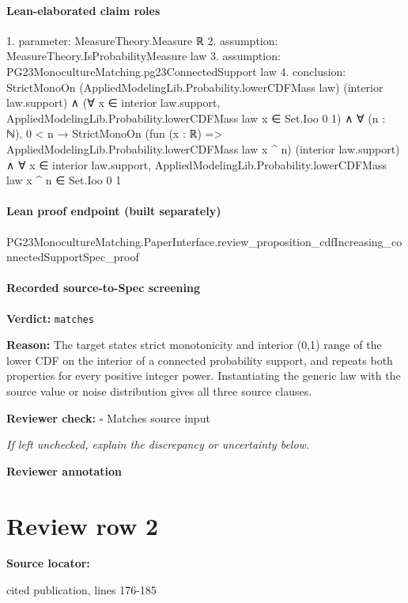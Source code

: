 \documentclass[10pt]{article}
\newcommand{\reviewerbox}{%
  \par\noindent\fbox{\parbox{0.96\linewidth}{\rule{0pt}{0.38in}}}\par
}
\newcommand{\reviewmatch}[1]{%
  \par\noindent\textbf{Reviewer check:} $\square$\; #1\par
  \noindent\emph{If left unchecked, explain the discrepancy or uncertainty below.}\par
}
\begin{document}
\paragraph{Lean-elaborated claim roles}\begin{ReviewVerbatim}
1. parameter: MeasureTheory.Measure ℝ
2. assumption: MeasureTheory.IsProbabilityMeasure law
3. assumption: PG23MonocultureMatching.pg23ConnectedSupport law
4. conclusion: StrictMonoOn (AppliedModelingLib.Probability.lowerCDFMass law) (interior law.support) ∧
  (∀ x ∈ interior law.support, AppliedModelingLib.Probability.lowerCDFMass law x ∈ Set.Ioo 0 1) ∧
    ∀ (n : ℕ),
      0 < n →
        StrictMonoOn (fun (x : ℝ) => AppliedModelingLib.Probability.lowerCDFMass law x ^ n) (interior law.support) ∧
          ∀ x ∈ interior law.support, AppliedModelingLib.Probability.lowerCDFMass law x ^ n ∈ Set.Ioo 0 1
\end{ReviewVerbatim}

\paragraph{Lean proof endpoint (built separately)}\begin{ReviewVerbatim}
PG23MonocultureMatching.PaperInterface.review_proposition_cdfIncreasing_connectedSupportSpec_proof
\end{ReviewVerbatim}

\paragraph{Recorded source-to-Spec screening}
\textbf{Verdict:} \texttt{matches}
\\
{\raggedright
\textbf{Reason:} The target states strict monotonicity and interior (0,1) range of the lower CDF on the interior of a connected probability support, and repeats both properties for every positive integer power.\allowbreak{} Instantiating the generic law with the source value or noise distribution gives all three source clauses.\allowbreak{}
\par}
\reviewmatch{Matches source input}
\noindent\textbf{Reviewer annotation}\par
\reviewerbox
\clearpage
\hypertarget{source-claim-f6924fab994f70b4}{}
\section*{Review row 2}
\textbf{Source locator:} {\footnotesize\raggedright cited publication, lines 176-\allowbreak{}185\par}
\end{document}

